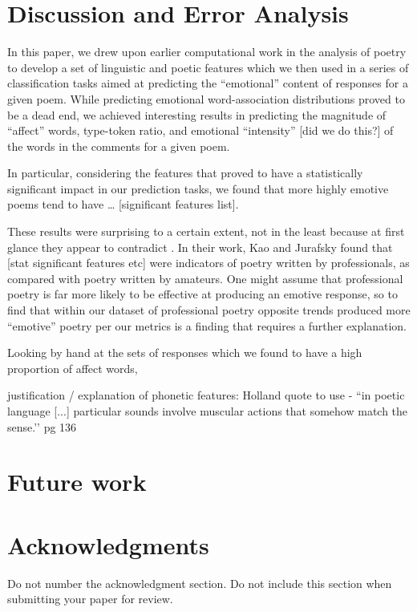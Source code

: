 \documentclass[11pt]{article}
\begin{document}
\section{Discussion and Error Analysis}
In this paper, we drew upon earlier computational work in the analysis of poetry to develop a set of linguistic and poetic features which we then used in a series of classification tasks aimed at predicting the ``emotional'' content of responses for a given poem. While predicting emotional word-association distributions proved to be a dead end, we achieved interesting results in predicting the magnitude of ``affect'' words, type-token ratio, and emotional ``intensity'' [did we do this?] of the words in the comments for a given poem.

In particular, considering the features that proved to have a statistically significant impact in our prediction tasks, we found that more highly emotive poems tend to have … [significant features list].

These results were surprising to a certain extent, not in the least because at first glance they appear to contradict . In their work, Kao and Jurafsky found that [stat significant features etc] were indicators of poetry written by professionals, as compared with poetry written by amateurs. One might assume that professional poetry is far more likely to be effective at producing an emotive response, so to find that within our dataset of professional poetry opposite trends produced more ``emotive'' poetry per our metrics is a finding that requires a further explanation.

Looking by hand at the sets of responses which we found to have a high proportion of affect words, 


justification / explanation of phonetic features: 
   Holland quote to use -  ``in poetic language [...] particular sounds involve muscular actions that somehow match the sense.’’ pg 136


\section{Future work}



\section*{Acknowledgments}

Do not number the acknowledgment section. Do not include this section when submitting your paper for review.




\end{document}
